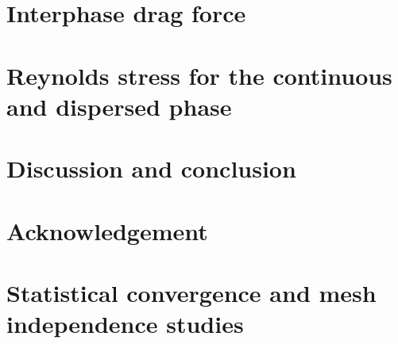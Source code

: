 \documentclass[12pt]{My_preprint}
\begin{document}
\section{Interphase drag force}



\section{Reynolds stress for the continuous and dispersed phase}

% 
% 

\section{Discussion and conclusion}


\section*{Acknowledgement}

\appendix
\section{Statistical convergence and mesh independence studies}
\label{ap:A}


\end{document}

